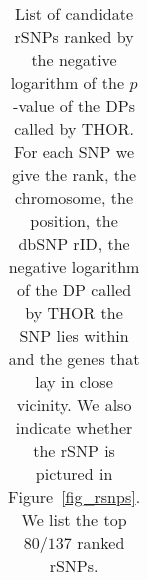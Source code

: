 \begin{table}[h!]
\begin{tabular}{rlrlrcllc}
 \end{tabular}
\caption[List of candidate rSNPs]{List of candidate rSNPs ranked by the negative logarithm of the $p$-value of the DPs called by THOR. 
For each SNP we give the rank, the chromosome, the position, the dbSNP rID, the negative logarithm of the DP called by THOR the SNP lies within and the genes that lay in close vicinity.
We also indicate whether the rSNP is pictured in Figure~\ref{fig_rsnps}.
We list the top $80/137$ ranked rSNPs.}
\label{tab_res_candidate_SNPs}
\end{table}


